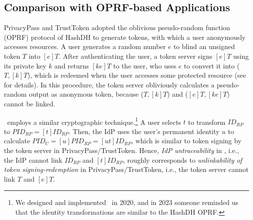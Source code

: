 \subsection{Comparison with OPRF-based Applications}
PrivacyPass and TrustToken \cite{privacypass,trusttoken} adopted the oblivious pseudo-random function (OPRF) protocol of HashDH \cite{oprf-proved,voprf-proved} to generate tokens, with which a user anonymously accesses resources.
A user generates a random number $e$ to blind an unsigned token $T$ into $[e]T$. After authenticating the user, a token server signs $[e]T$ using its private key $k$ and returns $[k e]T$ to the user, who uses $e$ to convert it into ($T, [k]T$),
        which is redeemed when the user accesses some protected resource
 (see \cite{privacypass,trusttoken,oprf-proved} for details).
In this procedure, the token server obliviously calculates a pseudo-random output as anonymous token,
    because ($T, [k]T$) and ($[e]T, [ke]T$) cannot be linked.


\usso\ employs a similar cryptographic technique.\footnote{We designed and implemented \usso\ in 2020, and in 2023 someone reminded us that the identity transformations are similar to the HashDH OPRF.} 
 A user selects $t$ to transform $ID_{RP}$ to $PID_{RP} = [t]ID_{RP}$.
Then, the IdP uses the user's permanent identity $u$ to calculate $PID_U = [u]PID_{RP} = [ut]ID_{RP}$,
which is similar to token signing by the token server in PrivacyPass/TrustToken.
Hence, \emph{IdP untraceability} in \usso, i.e., the IdP cannot link $ID_{RP}$ and $[t]ID_{RP}$,
 roughly corresponds to {\em unlinkability of token signing-redemption} in PrivacyPass/TrustToken, i.e., the token server cannot link $T$ and $[e]T$.

